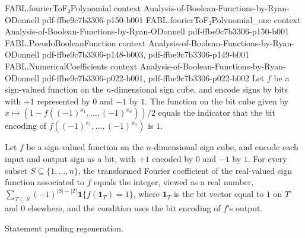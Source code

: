 \begin{theorem}
  {FABL.fourierToF₂Polynomial}
  {context}
  {Analysis-of-Boolean-Functions-by-Ryan-ODonnell}
  {pdf-ffbe9c7b3306-p150-b001}
\proofstep
  {FABL.fourierToF₂Polynomial_one}
  {context}
  {Analysis-of-Boolean-Functions-by-Ryan-ODonnell}
  {pdf-ffbe9c7b3306-p150-b001}
\proofstep
  {FABL.PseudoBooleanFunction}
  {context}
  {Analysis-of-Boolean-Functions-by-Ryan-ODonnell}
  {pdf-ffbe9c7b3306-p148-b003,
    pdf-ffbe9c7b3306-p149-b001}
\proofstep
  {FABL.NumericalCoefficients}
  {context}
  {Analysis-of-Boolean-Functions-by-Ryan-ODonnell}
  {pdf-ffbe9c7b3306-p022-b001,
    pdf-ffbe9c7b3306-p022-b002}
Let $f$ be a sign-valued function on the $n$-dimensional sign cube, and encode signs by
bits with $+1$ represented by $0$ and $-1$ by $1$. The function on the bit cube given by
$x\mapsto(1-f((-1)^{x_1},\ldots,(-1)^{x_n}))/2$ equals the indicator that the bit
encoding of $f((-1)^{x_1},\ldots,(-1)^{x_n})$ is $1$.
\end{theorem}

\begin{theorem}
\leanok
{}
Let $f$ be a sign-valued function on the $n$-dimensional sign cube, and encode each
input and output sign as a bit, with $+1$ encoded by $0$ and $-1$ by $1$. For every
subset $S\subseteq\{1,\ldots,n\}$, the transformed Fourier coefficient of the
real-valued sign function associated to $f$ equals the integer, viewed as a real number,
$\displaystyle\sum_{T\subseteq S}(-1)^{|S|-|T|}\mathbf{1}\{f(\mathbf{1}_T)=1\}$, where
$\mathbf{1}_T$ is the bit vector equal to $1$ on $T$ and $0$ elsewhere, and the
condition uses the bit encoding of $f$'s output.
\end{theorem}

\begin{theorem}
\label{FABL.algebraicDegree_intCastModTwo_le_numericalDegree}
\leanok
{}
Statement pending regeneration.
\end{theorem}

